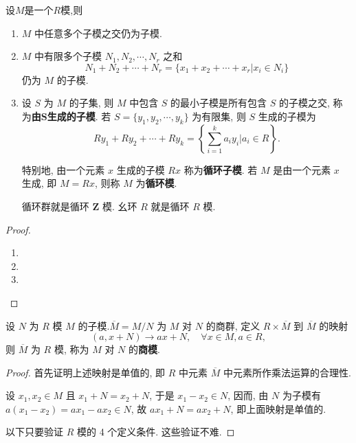 \documentclass[../../main.tex]{subfiles}
\begin{document}
\begin{theorem}
设$M$是一个$R$模,则
\begin{enumerate}[(1)]
\item \( M \) 中任意多个子模之交仍为子模.

\item \( M \) 中有限多个子模 \( N_1, N_2, \cdots, N_r \) 之和
\[
N_1 + N_2 + \cdots + N_r = \{x_1 + x_2 + \cdots + x_r | x_i \in N_i\}
\]
仍为 \( M \) 的子模.

\item 设 \( S \) 为 \( M \) 的子集, 则 \( M \) 中包含 \( S \) 的最小子模是所有包含 \( S \) 的子模之交, 称为\textbf{由\(\boldsymbol{S}\)生成的子模}. 若 \( S = \{y_1, y_2, \cdots, y_k\} \) 为有限集, 则 \( S \) 生成的子模为
\[
Ry_1 + Ry_2 + \cdots + Ry_k = \left\{ \sum_{i=1}^k a_i y_i \bigg| a_i \in R \right\}.
\]

特别地, 由一个元素 \( x \) 生成的子模 \( Rx \) 称为\textbf{循环子模}. 若 \( M \) 是由一个元素 \( x \) 生成, 即 \( M = Rx \), 则称 \( M \) 为\textbf{循环模}.

循环群就是循环 \( \mathbf{Z} \) 模. 幺环 \( R \) 就是循环 \( R \) 模.
\end{enumerate}
\end{theorem}
\begin{proof}
\begin{enumerate}[(1)]
\item 

\item 

\item 
\end{enumerate}
\end{proof}

\begin{theorem}
设 \( N \) 为 \( R \) 模 \( M \) 的子模.\( \overline{M} = M/N \) 为 \( M \) 对 \( N \) 的商群, 定义 \( R \times \overline{M} \) 到 \( \overline{M} \) 的映射
\[
(a, x + N) \to ax + N, \quad \forall x \in M, a \in R,
\]
则 \( \overline{M} \) 为 \( R \) 模, 称为 \( M \) 对 \( N \) 的\textbf{商模}.
\end{theorem}
\begin{proof}
首先证明上述映射是单值的, 即 \( R \) 中元素 \( \overline{M} \) 中元素所作乘法运算的合理性.

设 \( x_1, x_2 \in M \) 且 \( x_1 + N = x_2 + N \), 于是 \( x_1 - x_2 \in N \), 因而, 由 \( N \) 为子模有 \( a(x_1 - x_2) = ax_1 - ax_2 \in N \), 故 \( ax_1 + N = ax_2 + N \), 即上面映射是单值的.

以下只要验证 \( R \) 模的 4 个定义条件. 这些验证不难.
\end{proof}
\end{document}

